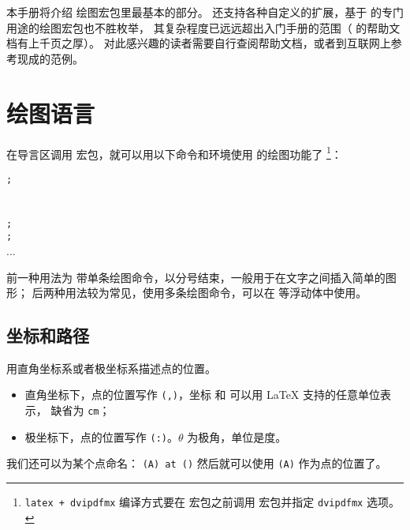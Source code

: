 本手册将介绍  绘图宏包里最基本的部分。 还支持各种自定义的扩展，基于  的专门用途的绘图宏包也不胜枚举，
其复杂程度已远远超出入门手册的范围（ 的帮助文档有上千页之厚）。
对此感兴趣的读者需要自行查阅帮助文档，或者到互联网上参考现成的范例。

\section{ 绘图语言}\label{sec:tikz}

在导言区调用  宏包，就可以用以下命令和环境使用  的绘图功能了%
\footnote{\texttt{latex + dvipdfmx} 编译方式要在  宏包之前调用  宏包并指定 \texttt{dvipdfmx} 选项。}：
\begin{command}
 \texttt{;} \\[1ex]
  \\[1ex]
 \\
\texttt{;} \\
\texttt{;} \\
... \\
\end{command}

前一种用法为  带单条绘图命令，以分号结束，一般用于在文字之间插入简单的图形；
后两种用法较为常见，使用多条绘图命令，可以在  等浮动体中使用。

\subsection{ 坐标和路径}\label{subsec:tikz-path}

 用直角坐标系或者极坐标系描述点的位置。
\begin{itemize}
  \item 直角坐标下，点的位置写作 \texttt{(,)}，坐标  和  可以用 \LaTeX{} 支持的任意单位表示，
  缺省为 \texttt{cm}；
  \item 极坐标下，点的位置写作 \texttt{(\Arg{$\theta$}:)}。$\theta$ 为极角，单位是度。
\end{itemize}

我们还可以为某个点命名： \texttt{(A) at ()}
然后就可以使用 \texttt{(A)} 作为点的位置了。

